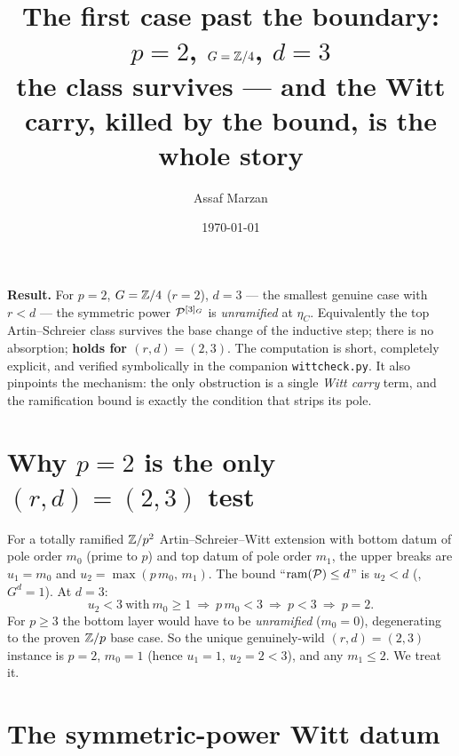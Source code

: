 \documentclass[11pt]{article}
\title{The first case past the boundary: $p=2$, $G=\mathbb{Z}/4$, $d=3$\\[2pt]
       {\large the class survives --- and the Witt carry, killed by the bound,
        is the whole story}}
\author{Assaf Marzan}
\date{\today}
\begin{document}
\maketitle

\noindent\textbf{Result.}
For $p=2$, $G=\mathbb{Z}/4$ ($r=2$), $d=3$ --- the smallest genuine case with $r<d$ ---
the symmetric power $\mathcal{P}^{[3]_G}$ is \emph{unramified} at $\eta_C$. Equivalently
the top Artin--Schreier class survives the base change of the inductive step;
there is no absorption; 
\textbf{holds for $(r,d)=(2,3)$}. The computation is short, completely explicit,
and verified symbolically in the companion \texttt{wittcheck.py}. It also
pinpoints the mechanism: the only obstruction is a single \emph{Witt carry}
term, and the ramification bound is exactly the condition that strips its pole.

\section{Why $p=2$ is the only $(r,d)=(2,3)$ test}\label{sec:p2}

For a totally ramified $\mathbb{Z}/p^2$ Artin--Schreier--Witt extension with bottom
datum of pole order $m_0$ (prime to $p$) and top datum of pole order $m_1$, the
upper breaks are $u_1=m_0$ and $u_2=\max(p\,m_0,\,m_1)$. The bound
``$\mathrm{ram}(\mathcal{P})\le d$'' is $u_2<d$ (,
$G^d=1$). At $d=3$:
\[
u_2<3 \ \text{with}\ m_0\ge1 \ \Longrightarrow\ p\,m_0<3 \ \Longrightarrow\
p<3 \ \Longrightarrow\ p=2 .
\]
For $p\ge3$ the bottom layer would have to be \emph{unramified} ($m_0=0$),
degenerating to the proven $\mathbb{Z}/p$ base case. So the unique genuinely-wild
$(r,d)=(2,3)$ instance is $p=2$, $m_0=1$ (hence $u_1=1$, $u_2=2<3$), and any
$m_1\le2$. We treat it.

\section{The symmetric-power Witt datum}\label{sec:datum}
\end{document}
